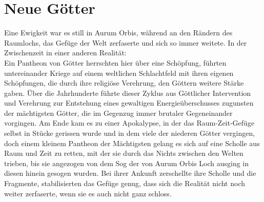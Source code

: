\documentclass[a4paper,12pt,oneside]{book}
\begin{document}
\section{Neue Götter}
Eine Ewigkeit war es still in Aurum Orbis, während an den Rändern des Raumlochs, das Gefüge der Welt zerfaserte und sich so immer weitete. In der Zwischenzeit in einer anderen Realität:
\\Ein Pantheon von Götter herrschten hier über eine Schöpfung, führten untereinander Kriege auf einem weltlichen Schlachtfeld mit ihren eigenen Schöpfungen, die durch ihre religiöse Verehrung, den Göttern weitere Stärke gaben. Über die Jahrhunderte führte dieser Zyklus aus Göttlicher Intervention und Verehrung zur Entstehung eines gewaltigen Energieüberschusses zugunsten der mächtigsten Götter, die im Gegenzug immer brutaler Gegeneinander vorgingen. Am Ende kam es zu einer Apokalypse, in der das Raum-Zeit-Gefüge selbst in Stücke gerissen wurde und in dem viele der niederen Götter vergingen, doch einem kleinem Pantheon der Mächtigsten gelang es sich auf eine Scholle aus Raum und Zeit zu retten, mit der sie durch das Nichts zwischen den Welten trieben, bis sie angezogen von dem Sog der von Aurum Orbis Loch ausging in diesen hinein gesogen wurden. Bei ihrer Ankunft zerschellte ihre Scholle und die Fragmente, stabilisierten das Gefüge genug, dass sich die Realität nicht noch weiter zerfaserte, wenn sie es auch nicht ganz schloss.
\end{document}
